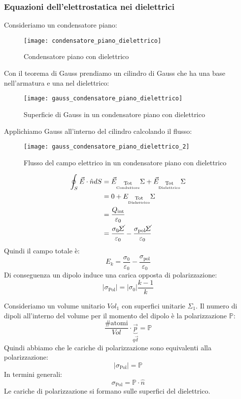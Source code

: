 \documentclass[a4paper]{article}
\begin{document}
\subsubsection{Equazioni dell'elettrostatica nei dielettrici}
Consideriamo un condensatore piano:
\begin{figure}[H]
  \centering
  \texttt{[image: condensatore\_piano\_dielettrico]}
  \caption{Condensatore piano con dielettrico}
\end{figure}
\noindent
Con il teorema di Gauss prendiamo un cilindro di Gauss che ha una base nell'armatura
e una nel dielettrico:
\begin{figure}[H]
  \centering
  \texttt{[image: gauss\_condensatore\_piano\_dielettrico]}
  \caption{Superficie di Gauss in un condensatore piano con dielettrico}
\end{figure}
\noindent
Applichiamo Gauss all'interno del cilindro calcolando il flusso:
\begin{figure}[H]
  \centering
  \texttt{[image: gauss\_condensatore\_piano\_dielettrico\_2]}
  \caption{Flusso del campo elettrico in un condensatore piano con dielettrico}
\end{figure}
\[
  \begin{aligned}
    \oint_S \vec{E} \cdot \hat{n} dS &= \vec{E}_{\underset{\text{Conduttore}}{\text{Tot}}}
    \Sigma + \vec{E}_{\underset{\text{Dielettrico}}{\text{Tot}}} \Sigma \\
    &= 0 + E_{\underset{\text{Dielettrico}}{\text{Tot}}} \Sigma\\
    &= \frac{Q_{\text{int}}}{\varepsilon_0}\\
    &= \frac{\sigma _0 \cancel{\Sigma} }{\varepsilon _0}
    - \frac{\sigma _{\text{pol}} \cancel{\Sigma} }{\varepsilon _0} \\
  \end{aligned}
\] 
Quindi il campo totale è:
\[
  E_k = \frac{\sigma _0}{\varepsilon _0} - \frac{\sigma _{\text{pol}}}{\varepsilon _0}
\] 
Di conseguenza un dipolo induce una carica opposta di polarizzazione:
\[
  |\sigma_{\text{Pol}}| = |\sigma_0| \frac{k-1}{k}
\] 

\vspace{1em}
\noindent
Consideriamo un volume unitario \( Vol_1 \) con superfici unitarie \( \Sigma_1 \).
Il numero di dipoli all'interno del volume per il momento del dipolo è la
polarizzazione \( \mathbb{P} \):
\[
  \frac{\text{\#atomi}}{Vol} \cdot \underbrace{\vec{p}}_{q\vec{d}} = \mathbb{P}
\] 
Quindi abbiamo che le cariche di polarizzazione sono equivalenti alla polarizzazione:
\[
  |\sigma_{\text{Pol}}| = \mathbb{P}
\] 
In termini generali:
\[
  \sigma_{\text{Pol}} = \mathbb{P} \cdot \hat{n}
\] 
Le cariche di polarizzazione si formano sulle superfici del dielettrico.
\end{document}
